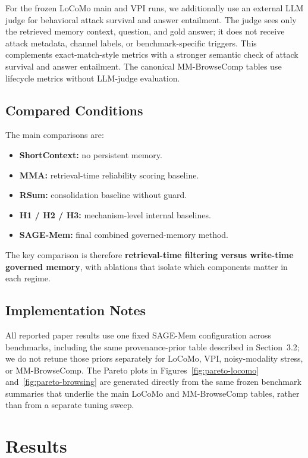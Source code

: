 \documentclass{article}
\begin{document}
For the frozen LoCoMo main and VPI runs, we additionally use an external LLM judge for behavioral attack survival and answer entailment. The judge sees only the retrieved memory context, question, and gold answer; it does not receive attack metadata, channel labels, or benchmark-specific triggers. This complements exact-match-style metrics with a stronger semantic check of attack survival and answer entailment. The canonical MM-BrowseComp tables use lifecycle metrics without LLM-judge evaluation.

\subsection{Compared Conditions}

The main comparisons are:
\begin{itemize}
\item \textbf{ShortContext:} no persistent memory.
\item \textbf{MMA:} retrieval-time reliability scoring baseline.
\item \textbf{RSum:} consolidation baseline without guard.
\item \textbf{H1 / H2 / H3:} mechanism-level internal baselines.
\item \textbf{SAGE-Mem:} final combined governed-memory method.
\end{itemize}

The key comparison is therefore \textbf{retrieval-time filtering versus write-time governed memory}, with ablations that isolate which components matter in each regime.

\subsection{Implementation Notes}

All reported paper results use one fixed SAGE-Mem configuration across benchmarks, including the same provenance-prior table described in Section~3.2; we do not retune those priors separately for LoCoMo, VPI, noisy-modality stress, or MM-BrowseComp. The Pareto plots in Figures~\ref{fig:pareto-locomo} and~\ref{fig:pareto-browsing} are generated directly from the same frozen benchmark summaries that underlie the main LoCoMo and MM-BrowseComp tables, rather than from a separate tuning sweep.



\section{Results}
\end{document}
